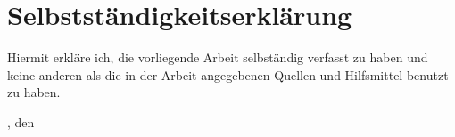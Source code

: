 \chapter*{Selbstständigkeitserklärung}
\thispagestyle{empty}
\noindent Hiermit erkläre ich, die vorliegende Arbeit selbständig verfasst zu haben und keine anderen als die in der Arbeit angegebenen Quellen und Hilfsmittel benutzt zu haben. 
\vspace*{1cm}

\noindent \getPrintLocationDE, den \getSubmissionDateDE

\vspace*{2cm}
\par\noindent\makebox[2.5in]{\hspace*{-1pt}\dotfill}
\par\noindent{}


